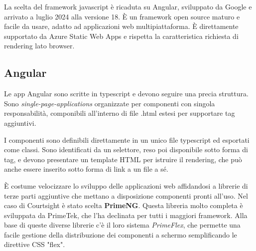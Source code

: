 La scelta del framework javascript è ricaduta su Angular, sviluppato da Google e arrivato a luglio 2024 alla versione 18. È un framework open source maturo e facile da usare, adatto ad applicazioni web multipiattaforma.
È direttamente supportato da Azure Static Web Apps e rispetta la caratteristica richiesta di rendering lato browser.


\subsection{Angular}
Le app Angular sono scritte in typescript e devono seguire una precia struttura. Sono \textit{single-page-applications} organizzate per componenti con singola responsabilità, componibili all'interno di file .html estesi per supportare tag aggiuntivi.

I componenti sono definibili direttamente in un unico file typescript ed esportati come classi. Sono identificati da un selettore, reso poi disponibile sotto forma di tag, e devono presentare un template HTML per istruire il rendering, che può anche essere inserito sotto forma di link a un file a sé.

È costume velocizzare lo sviluppo delle applicazioni web affidandosi a librerie di terze parti aggiuntive che mettano a disposizione componenti pronti all'uso. Nel caso di Courtsight è stato scelta \textbf{PrimeNG}.
Questa libreria molto completa è sviluppata da PrimeTek, che l'ha declinata per tutti i maggiori framework. Alla base di queste diverse librerie c'è il loro sistema \textit{PrimeFlex}, che permette una facile gestione della distribuzione dei componenti a schermo semplificando le direttive CSS "flex".

